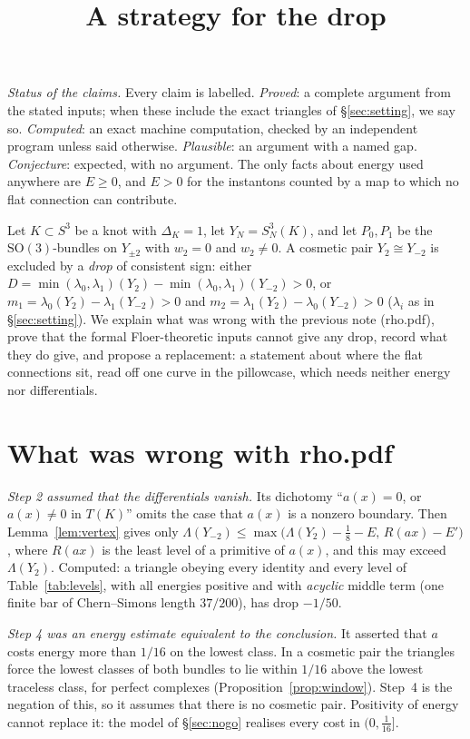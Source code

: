 \documentclass[10pt]{amsart}
\title{A strategy for the drop}
\date{}
\numberwithin{equation}{section}
\theoremstyle{compact}
\theoremstyle{definition}
\newcommand{\SO}{\mathrm{SO}}
\newcommand{\st}[1]{\par\noindent\textit{#1}\enspace}
\begin{document}
\maketitle
\vspace{-2.5em}

\noindent\textit{Status of the claims.} Every claim is labelled.
\emph{Proved}: a complete argument from the stated inputs; when these
include the exact triangles of \S\ref{sec:setting}, we say so.
\emph{Computed}: an exact machine computation, checked by an independent
program unless said otherwise. \emph{Plausible}: an argument with a named
gap. \emph{Conjecture}: expected, with no argument. The only facts about
energy used anywhere are $E\ge0$, and $E>0$ for the instantons counted by a
map to which no flat connection can contribute.

Let $K\subset S^3$ be a knot with $\Delta_K=1$, let $Y_N=S^3_N(K)$, and let
$P_0,P_1$ be the $\SO(3)$-bundles on $Y_{\pm2}$ with $w_2=0$ and $w_2\ne0$.
A cosmetic pair $Y_2\cong Y_{-2}$ is excluded by a \emph{drop} of consistent
sign: either $D=\min(\lambda_0,\lambda_1)(Y_2)-\min(\lambda_0,\lambda_1)(Y_{-2})>0$,
or $m_1=\lambda_0(Y_2)-\lambda_1(Y_{-2})>0$ and
$m_2=\lambda_1(Y_2)-\lambda_0(Y_{-2})>0$ ($\lambda_i$ as in
\S\ref{sec:setting}). We explain what was wrong with the previous note
(rho.pdf), prove that the formal Floer-theoretic inputs cannot give any
drop, record what they do give, and propose a replacement: a statement
about where the flat connections sit, read off one curve in the
pillowcase, which needs neither energy nor differentials.

\section{What was wrong with rho.pdf}

\st{Step 2 assumed that the differentials vanish.} Its dichotomy
``$a(x)=0$, or $a(x)\ne0$ in $T(K)$'' omits the case that $a(x)$ is a
nonzero boundary. Then Lemma~\ref{lem:vertex} gives only
$\Lambda(Y_{-2})\le\max\bigl(\Lambda(Y_2)-\frac18-E,\,R(ax)-E'\bigr)$, where
$R(ax)$ is the least level of a primitive of $a(x)$, and this may exceed
$\Lambda(Y_2)$. Computed: a triangle obeying every identity and every level
of Table~\ref{tab:levels}, with all energies positive and with
\emph{acyclic} middle term (one finite bar of Chern--Simons length
$37/200$), has drop $-1/50$.

\st{Step 4 was an energy estimate equivalent to the conclusion.} It
asserted that $a$ costs energy more than $1/16$ on the lowest class. In a
cosmetic pair the triangles force the lowest classes of both bundles to lie
within $1/16$ above the lowest traceless class, for perfect complexes
(Proposition~\ref{prop:window}). Step~4 is the negation of this, so it
assumes that there is no cosmetic pair. Positivity of energy cannot replace
it: the model of \S\ref{sec:nogo} realises every cost in $(0,\frac1{16}]$.
\end{document}
